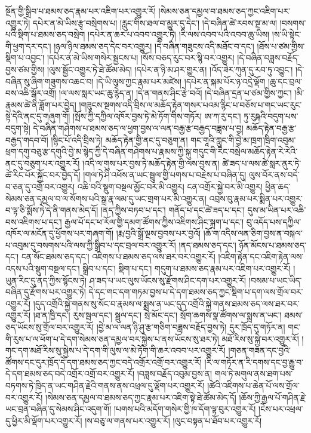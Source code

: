 སྔོན་གྱི་སྒྲིབ་པ་ཐམས་ཅད་རྣམ་པར་འཇིག་པར་འགྱུར་རོ། །སེམས་ཅན་དམྱལ་བ་ཐམས་ཅད་ཀྱང་འཇིག་པར་འགྱུར་ཏེ། དཔེར་ན་མེ་ཡིས་རྩྭ་བསྲེགས་པ། །རླུང་གིས་ཐལ་བ་མྱུར་དུ་དེང་། །དེ་བཞིན་ཚེ་རབས་སྔ་མ་ལ། །བསགས་པའི་སྡིག་པ་ཐམས་ཅད་བསྲེག །དཔེར་ན་ཆར་པ་འབབ་འགྱུར་ཏེ། །རི་ལས་འབབ་པའི་འབབ་ཆུ་ཡིས། །ས་ཡི་སྟེང་གི་ཕྱག་དར་དང་། །ཉལ་ཉིལ་ཐམས་ཅད་དེང་བར་འགྱུར། །དེ་བཞིན་གཟུངས་འདི་མཐོང་བ་དང་། །ཐོས་པ་ཙམ་གྱིས་སྡིག་པ་འབྱང་། །དཔེར་ན་མེ་ཡིས་གསེར་སྦྱངས་པ། །སོས་བཅད་རུང་བར་སྙི་བར་འགྱུར། །དེ་བཞིན་བཟླས་བརྗོད་བྱས་ཙམ་གྱིས། །ལུས་སྦྱོང་འགྱུར་ཏེ་ཐེ་ཚོམ་མེད། །དཔེར་ན་ཉི་མ་ཤར་གྱུར་ན། །འོད་ཟེར་ཀུན་དུ་རབ་ཏུ་འབྱུང་། །དེ་བཞིན་སུ་ཞིག་གཟུགས་འཆང་བ། །དེ་ཡི་ལུས་ཀྱང་རྣམ་པར་མཛེས། །དཔེར་ན་སྐམ་པོར་ཉ་འདྲེ་ལྡོག །ཆུ་དང་བྲལ་བས་འཆི་སྒོར་འགྲོ། །ལ་ལས་སླར་ཡང་ཆུ་རྙེད་ན། །དེ་ན་གནས་ཤིང་རྩེ་བའོ། །དེ་བཞིན་དྲན་པ་ཙམ་གྱིས་ཀྱང་། །མི་རྣམས་ཚེ་ནི་ཟློག་པར་བྱེད། །གཟུངས་སྔགས་འདི་བྲིས་ལ་མཆོད་རྟེན་གསར་པའམ་རྙིང་པ་བཅོས་པ་གང་ཡང་རུང་སྟེ་དེའི་ནང་དུ་གཞུག་གོ། །སྤོས་ཀྱི་དཀྱིལ་འཁོར་བྱས་ཏེ་མེ་ཏོག་གིས་གཏོར། ཨ་ཀ་རུ་དང་། ཏུ་རུཥྐའི་བདུག་པས་བདུག་སྟེ། དེ་བཞིན་གཤེགས་པ་ཐམས་ཅད་ལ་ཕྱག་བྱས་ལ་ལན་བརྒྱ་རྩ་བརྒྱད་བཟླས་པ་བྱ། མཆོད་རྟེན་བརྒྱ་རྩ་བརྒྱད་གདབ་བོ། །སྙིང་པོ་འདི་བྲིས་ཏེ། མཆོད་རྟེན་གྱི་ནང་དུ་བཅུག་ན། གང་གཱའི་ཀླུང་གི་བྱེ་མ་ཁྲག་ཁྲིག་འབུམ་ཕྲག་དགུ་བཅུ་རྩ་དགུའི་བྱེ་མ་སྙེད་ཀྱི་དེ་བཞིན་གཤེགས་པ་རྣམས་ཀྱི་སྐུ་གདུང་གི་རིང་བསྲེལ་མཆོད་རྟེན་རེ་རེའི་ནང་དུ་བཅུག་པར་འགྱུར་རོ། །འདི་ལ་གུས་པར་བྱས་ཏེ་མཆོད་རྟེན་གྱི་ལས་བྱས་ན། ཚེ་ཟད་པ་ལས་ཚེ་སླར་ནུར་ཏེ་ཚེ་རིང་པོར་སྐྱོང་བར་བྱེད་དོ། །གལ་ཏེ་ཤི་འཕོས་ན་ཡང་སྦྲུལ་གྱི་པགས་པ་བརྗེས་པ་བཞིན་དུ། ལུས་བོར་ནས་བདེ་བ་ཅན་དུ་འགྲོ་བར་འགྱུར། འཆི་བའི་སྡུག་བསྔལ་མྱོང་བར་མི་འགྱུར། ངན་འགྲོར་སྐྱེ་བར་མི་འགྱུར། ཕྱིན་ཆད་སེམས་ཅན་དམྱལ་བ་ལ་སོགས་པའི་སྒྲ་རྣ་ལམ་དུ་ཡང་གྲག་པར་མི་འགྱུར་ན། འབྲས་བུ་རྣམ་པར་སྨིན་པར་འགྱུར་བ་ལྟ་ཅི་སྨོས་ཏེ་དེ་ནི་གནས་མེད་དོ། །ནད་ཀྱིས་བཏབ་པ་དང་། གནོད་པ་དང་ཚེ་ཟད་པ་དང་། དུས་མ་ཡིན་པར་འཆི་བས་འཇིགས་པ་དང་། རྒྱལ་པོ་དང་ཕ་རོལ་གྱི་དམག་ཚོགས་ཀྱིས་འཇིགས་ཤིང་སྐྲག་པ་དང་། བུ་འདོད་པས་དཀྱིལ་འཁོར་ལ་མངོན་དུ་ཕྱོགས་པར་གཞག་གོ། །རྨ་བྱའི་སྒྲོ་ལྔས་བྱབས་པར་བྱའོ། །ཆོ་ག་འདིས་ལན་ཅིག་བྱས་ན་བསྐལ་པ་འབུམ་དུ་བསགས་པའི་ལས་ཀྱི་སྒྲིབ་པ་དང་བྲལ་བར་འགྱུར་རོ། །ནད་ཐམས་ཅད་དང་། ཉོན་མོངས་པ་ཐམས་ཅད་དང་། ངན་སོང་ཐམས་ཅད་དང་། འཇིགས་པ་ཐམས་ཅད་ལས་ཐར་བར་འགྱུར་རོ། །འཇིག་རྟེན་དང་འཇིག་རྟེན་ལས་འདས་པའི་སྡུག་བསྔལ་དང་། སྒྲིབ་པ་དང་། སྡིག་པ་དང་། གདུག་པ་ཐམས་ཅད་རྣམ་པར་འཇིག་པར་འགྱུར་རོ། །ཡུན་རིང་དུ་ནད་ཀྱིས་སྙོངས་ཏེ། ཤ་ཟད་པ་ཡང་ལུས་ཡོངས་སུ་རྫོགས་ཤིང་དག་པར་འགྱུར་རོ། །བསམ་པ་ཡང་ཡིད་བཞིན་དུ་རྫོགས་པར་འགྱུར་ཏེ། དེ་དང་གང་དག་གཏམ་བྱས་པ་དེ་དག་ཐམས་ཅད་ཀྱང་སྡིག་པ་དག་ལས་གྲོལ་བར་འགྱུར་རོ། །དུད་འགྲོའི་སྐྱེ་གནས་སུ་སོང་བ་རྣམས་ལ་སྨྲས་ན་ཡང་དུད་འགྲོའི་སྐྱེ་གནས་ཐམས་ཅད་ལས་ཐར་བར་འགྱུར་རོ། །ཐ་ན་ཁྱི་དང་། རུས་སྦལ་དང་། སྦྲུལ་དང་། སྲེ་མོང་དང་། སྲོག་ཆགས་སྣ་ཚོགས་ལ་སྨྲས་ན་ཡང་། ཐམས་ཅད་ཡོངས་སུ་གྲོལ་བར་འགྱུར་རོ། །བྱེ་མ་ལ་ལན་ཉི་ཤུ་རྩ་གཅིག་བཟླས་བརྗོད་བྱས་ཏེ། དུར་ཁྲོད་དུ་གཏོར་ན། གང་གི་རུས་པ་ལ་ཕོག་པ་དེ་དག་སེམས་ཅན་དམྱལ་བར་སྐྱེས་པ་ནས་ཡོངས་སུ་ཐར་ཏེ། མཐོ་རིས་སུ་སྐྱེ་བར་འགྱུར་རོ། །གང་དག་མཐོ་རིས་སུ་སྐྱེས་པ་དེ་དག་གི་ལུས་ལ་མེ་ཏོག་གི་ཆར་འབབ་པར་འགྱུར་རོ། །གཅན་གཟན་དང་བྱའི་ཚོགས་དང་དུར་ཁྲོད་དེ་དག་ཐམས་ཅད་ཀྱང་བདེ་འགྲོར་འགྲོ་བར་འགྱུར་རོ། །རི་ལ་གཏོར་ན་རི་དགས་དང་བྱ་རྒྱུ་བ་དེ་དག་ཐམས་ཅད་བདེ་འགྲོར་འགྲོ་བར་འགྱུར་རོ། །བཟླས་བརྗོད་འབུམ་བྱས་ན། གལ་ཏེ་མགུལ་ནས་ཐག་པས་བཏགས་ཏེ་ཁྲིད་ན་ཡང་གཤིན་རྗེའི་གནས་ནས་འཕྲལ་དུ་ལྡོག་པར་འགྱུར་རོ། །ཚེའི་འཇིགས་པ་ཆེན་པོ་ལས་གྲོལ་བར་འགྱུར་རོ། །སེམས་ཅན་དམྱལ་བ་ཐམས་ཅད་ཀྱང་རྣམ་པར་འཇིག་སྟེ་ཐེ་ཚོམ་མེད་དོ། །ཆོས་ཀྱི་རྒྱལ་པོ་གཤིན་རྗེ་ཡང་བྲན་བཞིན་དུ་སེམས་ཤིང་འདུག་གོ། །པགས་པའི་མདོག་གསེར་གྱི་ཁ་དོག་ལྟ་བུར་འགྱུར་རོ། །ངེས་པར་འཕྲལ་དུ་ཕྱིར་མི་ལྡོག་པར་འགྱུར་རོ། །ས་བཅུ་ལ་གནས་པར་འགྱུར་རོ། །ལུང་བསྟན་པ་ཐོབ་པར་འགྱུར་རོ། 